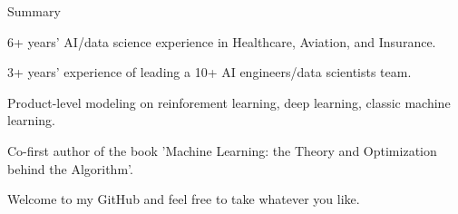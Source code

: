 \documentclass{resume} %
\begin{document}

\begin{rSection}{Summary} 

\begin{rSubsection}{}{}{}{}
\item 6+ years' AI/data science experience in Healthcare, Aviation, and Insurance.
\item 3+ years' experience of leading a 10+ AI engineers/data scientists team.
\item Product-level modeling on reinforement learning, deep learning, classic machine learning.
\item Co-first author of the book 'Machine Learning: the Theory and Optimization behind the Algorithm'.
\item Welcome to my GitHub and feel free to take whatever you like.
\end{rSubsection}


\end{rSection}

\end{document}
